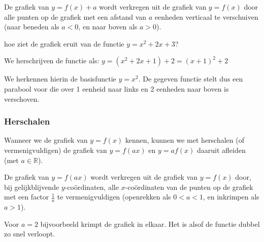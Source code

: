 \begin{figure}[H]
\begin{center}
	
\end{center}
\end{figure}



De grafiek van $y=f(x)+a$ wordt verkregen uit de grafiek
van $y=f(x)$ door alle punten op de grafiek met een afstand van $a$
eenheden verticaal te verschuiven (naar beneden als $a<0$, en naar
boven als $a>0$).


\begin{figure}[H]
	
\end{figure}


\begin{figure}[H]
	
\end{figure}


\begin{voorbeeld}
hoe ziet de grafiek eruit van de functie $y=x^{2}+2x+3$?

We herschrijven de functie als: $y=\left(x^{2}+2x+1\right)+2=\left(x+1\right)^{2}+2$

We herkennen hierin de basisfunctie $y=x^{2}$. De gegeven functie
stelt dus een parabool voor die over 1 eenheid naar links en 2 eenheden
naar boven is verschoven.
\end{voorbeeld}


\subsubsection{Herschalen}

Wanneer we de grafiek van $y=f(x)$ kennen, kunnen we met
herschalen (of vermenigvuldigen) de grafiek van $y=f(ax)$ en $y=af(x)$
daaruit afleiden (met $a\in\mathbb{R}$).

De grafiek van $y=f(ax)$ wordt verkregen uit de grafiek
van $y=f(x)$ door, bij gelijkblijvende $y$-co\"ordinaten, alle $x$-co\"ordinaten
van de punten op de grafiek met een factor $\frac{1}{a}$ te vermenigvuldigen
(openrekken als $0<a<1$, en inkrimpen als $a>1$).

Voor $a=2$ bijvoorbeeld krimpt de grafiek in elkaar. Het
is alsof de functie dubbel zo snel verloopt.


\begin{figure}[H]
	
\end{figure}
  
